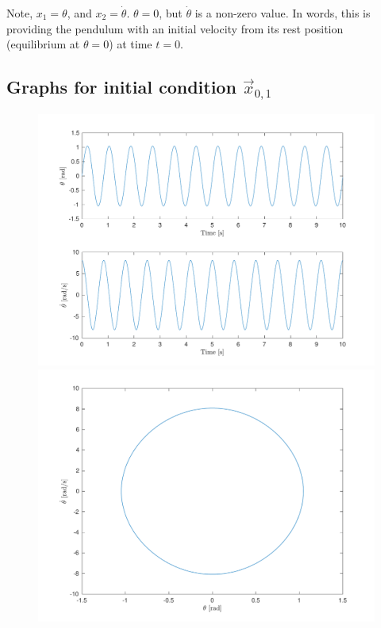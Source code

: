 \documentclass[10pt]{article}
\begin{document}
Note, $x_1 = \theta$, and $x_2 = \dot{\theta}$. 
$\theta = 0$, but $\dot{\theta}$ is a non-zero value. In words, this is providing the pendulum with an initial velocity from its rest position (equilibrium at $\theta = 0$) at time $t = 0$.

\subsection{Graphs for initial condition $\vec{x}_{0,1}$}
\begin{figure}[ht]
    \centering
    \begin{minipage}[b]{0.45\textwidth}
        \centering
        \includegraphics[width=1\linewidth]{lab1/figs/section3_x0_1_state_evolution.pdf}
    \end{minipage}
    \begin{minipage}[b]{0.45\textwidth}
        \centering
        \includegraphics[width=1\linewidth]{lab1/figs/section3_x0_1_state_orbit.pdf}
    \end{minipage}
    
    \label{figure:x_0_1_state_evolution}
\end{figure}
    
\end{document}
